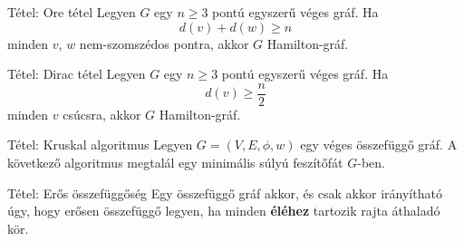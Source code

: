 \documentclass{beamer}
\begin{document}
\begin{frame}

\begin{block}{Tétel: Ore tétel}
Legyen $G$ egy $n \geq 3$ pontú egyszerű véges gráf. Ha $$d(v) + d(w) \geq n$$ minden $v$, $w$ nem-szomszédos pontra, akkor $G$ Hamilton-gráf.

\end{block}

\begin{block}{Tétel: Dirac tétel}
Legyen $G$ egy $n \geq 3$ pontú egyszerű véges gráf. Ha $$d(v) \geq \frac{n}{2}$$ minden $v$ csúcsra, akkor $G$ Hamilton-gráf.

\end{block}

\end{frame}

\begin{frame}

\begin{block}{Tétel: Kruskal algoritmus}
Legyen $G = (V, E, {\phi}, w)$ egy véges összefüggő gráf. A következő algoritmus megtalál egy minimális súlyú feszítőfát $G$-ben.
    
\end{block}


\end{frame}

\begin{frame}

\begin{block}{Tétel: Erős összefüggőség}
Egy összefüggő gráf akkor, és csak akkor irányítható úgy, hogy erősen összefüggő legyen, ha minden \textbf{éléhez} tartozik rajta áthaladó kör.
\end{block}

\end{frame}
\end{document}
